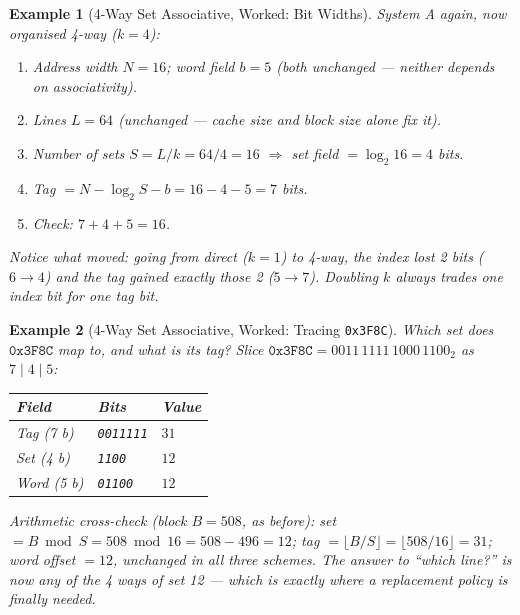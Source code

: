 \documentclass[11pt]{article}
\newtheorem{example}{Example}[section]
\begin{document}
\begin{example}[4-Way Set Associative, Worked: Bit Widths]
\label{ex:set-assoc-widths}
System A again, now organised 4-way ($k = 4$):

\begin{enumerate}
  \item Address width $N = 16$; word field $b = 5$ (both unchanged --- neither depends on associativity).
  \item Lines $L = 64$ (unchanged --- cache size and block size alone fix it).
  \item Number of sets $S = L/k = 64/4 = 16$ $\Rightarrow$ set field $= \log_2 16 = 4$ bits.
  \item Tag $= N - \log_2 S - b = 16 - 4 - 5 = 7$ bits.
  \item Check: $7 + 4 + 5 = 16$.
\end{enumerate}

Notice what moved: going from direct ($k{=}1$) to 4-way, the index lost 2 bits ($6 \to 4$) and the tag gained exactly those 2 ($5 \to 7$). Doubling $k$ always trades one index bit for one tag bit.
\end{example}

\begin{example}[4-Way Set Associative, Worked: Tracing \texttt{0x3F8C}]
\label{ex:set-assoc-trace}
Which \emph{set} does $\texttt{0x3F8C}$ map to, and what is its tag? Slice $\texttt{0x3F8C} = 0011\,1111\,1000\,1100_2$ as $7 \mid 4 \mid 5$:

\begin{center}
\begin{tabular}{@{}lll@{}}
  \toprule
  \textbf{Field} & \textbf{Bits} & \textbf{Value} \\
  \midrule
  Tag (7 b)  & \texttt{0011111} & $31$ \\
  Set (4 b)  & \texttt{1100}    & $12$ \\
  Word (5 b) & \texttt{01100}   & $12$ \\
  \bottomrule
\end{tabular}
\end{center}

Arithmetic cross-check (block $B = 508$, as before): set $= B \bmod S = 508 \bmod 16 = 508 - 496 = 12$; tag $= \lfloor B/S \rfloor = \lfloor 508/16 \rfloor = 31$; word offset $= 12$, unchanged in all three schemes. The answer to ``which line?'' is now \emph{any of the 4 ways of set 12} --- which is exactly where a replacement policy is finally needed.
\end{example}
\end{document}
